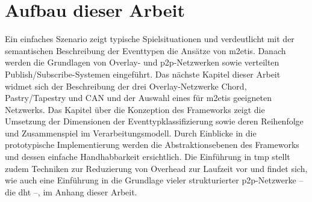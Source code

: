 \section*{Aufbau dieser Arbeit}
Ein einfaches Szenario zeigt typische Spielsituationen und verdeutlicht mit der semantischen Beschreibung der Eventtypen die Ansätze von \ac{m2etis}. Danach werden die Grundlagen von Overlay- und p2p-Netzwerken sowie verteilten Publish/Subscribe-Systemen eingeführt. Das nächste Kapitel dieser Arbeit widmet sich der Beschreibung der drei Overlay-Netzwerke Chord, Pastry/Tapestry und CAN und der Auswahl eines für \ac{m2etis} geeigneten Netzwerks. Das Kapitel über die Konzeption des Frameworks zeigt die Umsetzung der Dimensionen der Eventtypklassifizierung sowie deren Reihenfolge und Zusammenspiel im Verarbeitungsmodell. Durch Einblicke in die prototypische Implementierung werden die Abstraktionsebenen des Frameworks und dessen einfache Handhabbarkeit ersichtlich. Die Einführung in \ac{tmp} stellt zudem Techniken zur Reduzierung von Overhead zur Laufzeit vor und findet sich, wie auch eine Einführung in die Grundlage vieler strukturierter \ac{p2p}-Netzwerke -- die \ac{dht} --, im Anhang dieser Arbeit.
